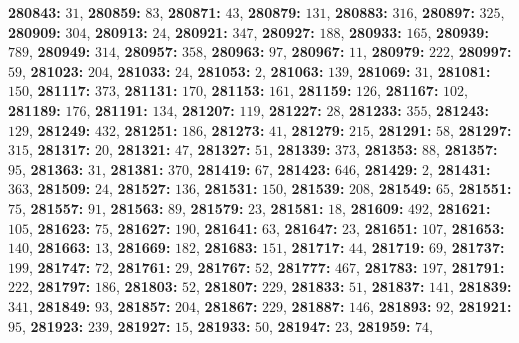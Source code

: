 \textsf{\bfseries 280843:} $31$, \textsf{\bfseries 280859:} $83$, \textsf{\bfseries 280871:} $43$, \textsf{\bfseries 280879:} $131$, \textsf{\bfseries 280883:} $316$, \textsf{\bfseries 280897:} $325$, \textsf{\bfseries 280909:} $304$, \textsf{\bfseries 280913:} $24$, \textsf{\bfseries 280921:} $347$, \textsf{\bfseries 280927:} $188$, \textsf{\bfseries 280933:} $165$, \textsf{\bfseries 280939:} $789$, \textsf{\bfseries 280949:} $314$, \textsf{\bfseries 280957:} $358$, \textsf{\bfseries 280963:} $97$, \textsf{\bfseries 280967:} $11$, \textsf{\bfseries 280979:} $222$, \textsf{\bfseries 280997:} $59$, \textsf{\bfseries 281023:} $204$, \textsf{\bfseries 281033:} $24$, \textsf{\bfseries 281053:} $2$, \textsf{\bfseries 281063:} $139$, \textsf{\bfseries 281069:} $31$, \textsf{\bfseries 281081:} $150$, \textsf{\bfseries 281117:} $373$, \textsf{\bfseries 281131:} $170$, \textsf{\bfseries 281153:} $161$, \textsf{\bfseries 281159:} $126$, \textsf{\bfseries 281167:} $102$, \textsf{\bfseries 281189:} $176$, \textsf{\bfseries 281191:} $134$, \textsf{\bfseries 281207:} $119$, \textsf{\bfseries 281227:} $28$, \textsf{\bfseries 281233:} $355$, \textsf{\bfseries 281243:} $129$, \textsf{\bfseries 281249:} $432$, \textsf{\bfseries 281251:} $186$, \textsf{\bfseries 281273:} $41$, \textsf{\bfseries 281279:} $215$, \textsf{\bfseries 281291:} $58$, \textsf{\bfseries 281297:} $315$, \textsf{\bfseries 281317:} $20$, \textsf{\bfseries 281321:} $47$, \textsf{\bfseries 281327:} $51$, \textsf{\bfseries 281339:} $373$, \textsf{\bfseries 281353:} $88$, \textsf{\bfseries 281357:} $95$, \textsf{\bfseries 281363:} $31$, \textsf{\bfseries 281381:} $370$, \textsf{\bfseries 281419:} $67$, \textsf{\bfseries 281423:} $646$, \textsf{\bfseries 281429:} $2$, \textsf{\bfseries 281431:} $363$, \textsf{\bfseries 281509:} $24$, \textsf{\bfseries 281527:} $136$, \textsf{\bfseries 281531:} $150$, \textsf{\bfseries 281539:} $208$, \textsf{\bfseries 281549:} $65$, \textsf{\bfseries 281551:} $75$, \textsf{\bfseries 281557:} $91$, \textsf{\bfseries 281563:} $89$, \textsf{\bfseries 281579:} $23$, \textsf{\bfseries 281581:} $18$, \textsf{\bfseries 281609:} $492$, \textsf{\bfseries 281621:} $105$, \textsf{\bfseries 281623:} $75$, \textsf{\bfseries 281627:} $190$, \textsf{\bfseries 281641:} $63$, \textsf{\bfseries 281647:} $23$, \textsf{\bfseries 281651:} $107$, \textsf{\bfseries 281653:} $140$, \textsf{\bfseries 281663:} $13$, \textsf{\bfseries 281669:} $182$, \textsf{\bfseries 281683:} $151$, \textsf{\bfseries 281717:} $44$, \textsf{\bfseries 281719:} $69$, \textsf{\bfseries 281737:} $199$, \textsf{\bfseries 281747:} $72$, \textsf{\bfseries 281761:} $29$, \textsf{\bfseries 281767:} $52$, \textsf{\bfseries 281777:} $467$, \textsf{\bfseries 281783:} $197$, \textsf{\bfseries 281791:} $222$, \textsf{\bfseries 281797:} $186$, \textsf{\bfseries 281803:} $52$, \textsf{\bfseries 281807:} $229$, \textsf{\bfseries 281833:} $51$, \textsf{\bfseries 281837:} $141$, \textsf{\bfseries 281839:} $341$, \textsf{\bfseries 281849:} $93$, \textsf{\bfseries 281857:} $204$, \textsf{\bfseries 281867:} $229$, \textsf{\bfseries 281887:} $146$, \textsf{\bfseries 281893:} $92$, \textsf{\bfseries 281921:} $95$, \textsf{\bfseries 281923:} $239$, \textsf{\bfseries 281927:} $15$, \textsf{\bfseries 281933:} $50$, \textsf{\bfseries 281947:} $23$, \textsf{\bfseries 281959:} $74$, 

